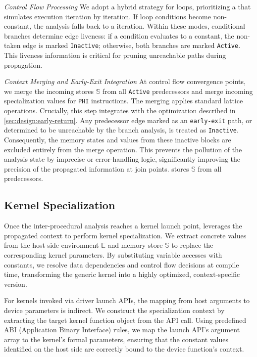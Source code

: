 \textit{Control Flow Processing}
We adopt a hybrid strategy for loops, prioritizing a  that simulates execution iteration by iteration.
If loop conditions become non-constant, the analysis falls back to a  iteration.
Within these modes, conditional branches determine edge liveness: if a condition evaluates to a constant, the non-taken edge is marked \texttt{Inactive}; otherwise, both branches are marked \texttt{Active}.
This liveness information is critical for pruning unreachable paths during propagation.

\textit{Context Merging and Early-Exit Integration}
At control flow convergence points, we merge the incoming stores $\mathbb{S}$ from all \texttt{Active} predecessors and merge incoming specialization values for \texttt{PHI} instructions.
The merging applies standard lattice operations.
Crucially, this step integrates with the optimization described in \cref{sec:design:early-return}.
Any predecessor edge marked as an \texttt{early-exit} path, or determined to be unreachable by the branch analysis, is treated as \texttt{Inactive}.
Consequently, the memory states and values from these inactive blocks are excluded entirely from the merge operation.
This prevents the pollution of the analysis state by imprecise or error-handling logic, significantly improving the precision of the propagated information at join points. stores $\mathbb{S}$ from all predecessors.

\subsection{Kernel Specialization}
\label{sec:design:specialization}

Once the inter-procedural analysis reaches a kernel launch point, \mysys leverages the propagated context to perform kernel specialization. 
We extract concrete values from the host-side environment $\mathbb{E}$ and memory store $\mathbb{S}$ to replace the corresponding kernel parameters. 
By substituting variable accesses with constants, we resolve data dependencies and control flow decisions at compile time, transforming the generic kernel into a highly optimized, context-specific version.

For kernels invoked via driver launch APIs, the mapping from host arguments to device parameters is indirect. 
We construct the specialization context by extracting the target kernel function object from the API call. 
Using predefined ABI (Application Binary Interface) rules, we map the launch API's argument array to the kernel's formal parameters, ensuring that the constant values identified on the host side are correctly bound to the device function's context.

